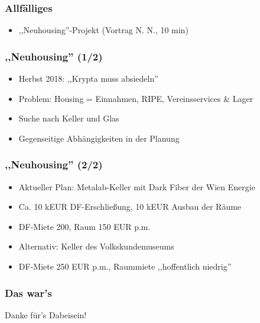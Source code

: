 \documentclass[17pt]{beamer} %
\begin{document}
\begin{frame}
	\frametitle{Allfälliges}
	\begin{itemize}
		\item ,,Neuhousing''-Projekt (Vortrag N. N., 10 min)
	\end{itemize}
\end{frame}



\begin{frame}
	\frametitle{,,Neuhousing'' (1/2)}
	\begin{itemize}
		\item Herbst 2018: ,,Krypta muss absiedeln''
		\item Problem: Housing = Einnahmen, RIPE, Vereinsservices \& Lager
		\item Suche nach Keller und Glas
		\item Gegenseitige Abhängigkeiten in der Planung
	\end{itemize}
\end{frame}



\begin{frame}
	\frametitle{,,Neuhousing'' (2/2)}
	\begin{itemize}
		\item Aktueller Plan: Metalab-Keller mit Dark Fiber der Wien Energie
		\item Ca. 10 kEUR DF-Erschließung, 10 kEUR Ausbau der Räume
		\item DF-Miete 200, Raum 150 EUR p.m.
		\item Alternativ: Keller des Volkskundemuseums
		\item DF-Miete 250 EUR p.m., Raummiete ,,hoffentlich niedrig''
	\end{itemize}
\end{frame}



\begin{frame}
	\frametitle{Das war's}
	Danke für's Dabeisein!
\end{frame}

\end{document}
